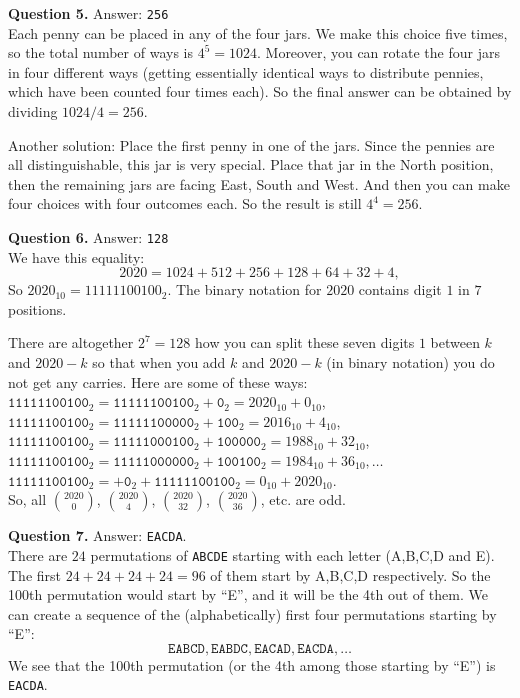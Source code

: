 \documentclass[jou]{apa6}
\begin{document}
\vspace{10pt}
{\bf Question 5.} Answer: {\tt 256}\\
Each penny can be placed in any of the four jars. We make this choice five times, so the
total number of ways is $4^5 = 1024$. Moreover, you can rotate the four jars in four different ways (getting
essentially identical ways to distribute pennies, which have been counted four times each). 
So the final answer can be obtained by dividing $1024/4 = 256$.

Another solution: Place the first penny in one of the jars.
Since the pennies are all distinguishable, this jar is very special.
Place that jar in the North position, then the remaining jars are facing East, South and West.
And then you can make four choices with four outcomes each. So the result is still $4^4 = 256$.

\vspace{10pt}
{\bf Question 6.} Answer: {\tt 128}\\
We have this equality:
$$2020 = 1024 + 512 + 256 + 128 + 64 + 32 + 4,$$
So $2020_{10} = 11111100100_2$. The binary notation for $2020$
contains digit $1$ in $7$ positions. 

There are altogether
$2^7 = 128$ how you can split these seven digits $1$ between 
$k$ and $2020-k$ so that when you add $k$ and $2020-k$ (in binary notation) 
you do not get any carries. Here are some of these ways:\\
{\small
$\mathtt{11111100100}_2 = \mathtt{11111100100}_2 + \mathtt{0}_2 = 2020_{10}+0_{10}$,\\
$\mathtt{11111100100}_2 = \mathtt{11111100000}_2 + \mathtt{100}_2 = 2016_{10} + 4_{10}$,\\
$\mathtt{11111100100}_2 = \mathtt{11111000100}_2 + \mathtt{100000}_2 = 1988_{10} + 32_{10}$,\\
$\mathtt{11111100100}_2 = \mathtt{11111000000}_2 + \mathtt{100100}_2 = 1984_{10} + 36_{10},\ldots$\\
$\mathtt{11111100100}_2 = + \mathtt{0}_2 + \mathtt{11111100100}_2  = 0_{10} + 2020_{10}$.\\
}
So, all ${2020 \choose 0}$,  ${2020 \choose 4}$,  ${2020 \choose 32}$,  ${2020 \choose 36}$, etc. are odd.



\vspace{10pt}
{\bf Question 7.} Answer: {\tt EACDA}.\\
There are $24$ permutations of {\tt ABCDE} starting with each 
letter (A,B,C,D and E). The first $24+24+24+24=96$ of them start by A,B,C,D respectively. 
So the 100th permutation would start by ``E'', and it will be the 4th out of them. 
We can create a sequence of the (alphabetically) first four permutations starting by ``E'':
$$\mathtt{EABCD},\mathtt{EABDC},\mathtt{EACAD},\mathtt{EACDA},\ldots$$
We see that the 100th permutation (or the 4th among those starting by ``E'') is 
{\tt EACDA}.
\end{document}
